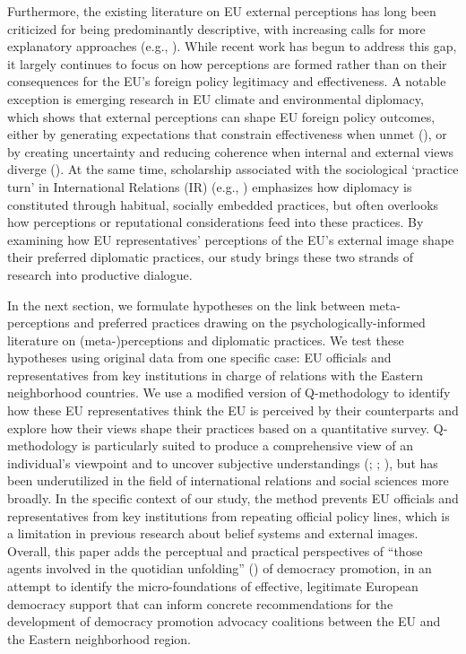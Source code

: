 \documentclass[
  letterpaper,
  DIV=11,
  numbers=noendperiod]{scrartcl}
\begin{document}
Furthermore, the existing literature on EU external perceptions has long
been criticized for being predominantly descriptive, with increasing
calls for more explanatory approaches (e.g.,
). While recent
work has begun to address this gap, it largely continues to focus on how
perceptions are formed rather than on their consequences for the EU's
foreign policy legitimacy and effectiveness. A notable exception is
emerging research in EU climate and environmental diplomacy, which shows
that external perceptions can shape EU foreign policy outcomes, either
by generating expectations that constrain effectiveness when unmet
(), or by creating
uncertainty and reducing coherence when internal and external views
diverge (). At the
same time, scholarship associated with the sociological `practice turn'
in International Relations (IR) (e.g., ) emphasizes how diplomacy is constituted through
habitual, socially embedded practices, but often overlooks how
perceptions or reputational considerations feed into these practices. By
examining how EU representatives' perceptions of the EU's external image
shape their preferred diplomatic practices, our study brings these two
strands of research into productive dialogue.

In the next section, we formulate hypotheses on the link between
meta-perceptions and preferred practices drawing on the
psychologically-informed literature on (meta-)perceptions and diplomatic
practices. We test these hypotheses using original data from one
specific case: EU officials and representatives from key institutions in
charge of relations with the Eastern neighborhood countries. We use a
modified version of Q-methodology to identify how these EU
representatives think the EU is perceived by their counterparts and
explore how their views shape their practices based on a quantitative
survey. Q-methodology is particularly suited to produce a comprehensive
view of an individual's viewpoint and to uncover subjective
understandings (; ; ), but has been
underutilized in the field of international relations and social
sciences more broadly. In the specific context of our study, the method
prevents EU officials and representatives from key institutions from
repeating official policy lines, which is a limitation in previous
research about belief systems and external images. Overall, this paper
adds the perceptual and practical perspectives of ``those agents
involved in the quotidian unfolding''
() of democracy
promotion, in an attempt to identify the micro-foundations of effective,
legitimate European democracy support that can inform concrete
recommendations for the development of democracy promotion advocacy
coalitions between the EU and the Eastern neighborhood region.
\end{document}

